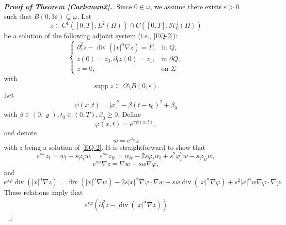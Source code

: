 \documentclass[11pt]{article}
\numberwithin{equation}{section}
\def\pt{\partial}
\def\s{\subseteq}
\def\e{\varepsilon }
\def\vp{\varphi}
\def\bf{\textbf}
\def\pt{\partial}
\def\om{\omega}
\def\Om{\Omega}
\def\al{\alpha}
\def\be{\beta}
\def\ga{\gamma}
\def\se{\setminus}
\def\mcH{\mathcal{H}}
\DeclareMathOperator{\Div}{div}
\DeclareMathOperator{\supp}{{supp}}
\begin{document}
		\begin{proof}[{\rm \bf { Proof of  Theorem \ref{Carleman2}.}}]
			Since $0\in\om$, we assume there exists $\varepsilon >0$ such that  $B(0,3\varepsilon )\s\om$. Let
			\begin{equation*}
				z\in C^1([0,T]; L^2(\Om))\cap C([0,T]; \mcH_0^1(\Om))
			\end{equation*}
			be a solution of the following adjoint system (i.e., \eqref{EQ-2}):
			\begin{equation*}
				\begin{cases}
					\pt_t^2z-\Div\left(|x|^\al \nabla z\right)=F, & \mbox{in } Q,\\
					z(0)=z_0, \pt_tz(0)=z_1, &\mbox{in }\pt Q,\\
					z=0, &\mbox{on }\Sigma
				\end{cases}
			\end{equation*}
			with
			\begin{equation}\label{*}
				\supp z\s \Om\se B(0,\e).
			\end{equation}
			Let
			\begin{equation*}
				\psi(x,t)=|x|^2-\be(t-t_0)^2+\be_0
			\end{equation*}
			with $\be\in (0,\varrho), t_0\in (0,T),\be_0\geq 0$. Define
			\begin{equation}\label{vp}
				\vp(x,t)=e^{\ga\psi(x,t)},
			\end{equation}
			and denote
			\begin{equation*}
				w=e^{s\vp}z
			\end{equation*}
			with $z$ being  a solution of \eqref{EQ-2}. It is straightforward to show that
			\begin{equation*}
				e^{s\vp}z_t=w_t-s\vp_tw, \quad e^{s\vp}z_{tt}=w_{tt}-2s\vp_tw_t+s^2\vp_t^2w-s\vp_{tt}w,
			\end{equation*}
			\begin{equation*}
				e^{s\vp}\nabla z=\nabla w-sw\nabla\vp,
			\end{equation*}
			and
			\begin{equation*}
				e^{s\vp}\Div(|x|^\al \nabla z)=\Div\left(|x|^\al \nabla w\right)-2s|x|^\al \nabla \vp\cdot \nabla w-sw\Div\left(|x|^\al \nabla\vp\right)+s^2|x|^\al w\nabla\vp\cdot \nabla\vp.
			\end{equation*}
			These relations imply that
			\begin{equation*}
				\begin{split}
					e^{s\vp}\left(\pt_t^2z-\Div\left(|x|^\al \nabla z\right)\right)

\end{split}
\end{equation*}
\end{proof}
\end{document}
